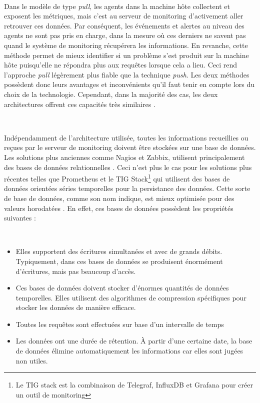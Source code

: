 ~

\noindent
Dans le modèle de type \textit{pull}, les agents dans la machine hôte collectent et exposent les métriques, mais c'est au serveur de monitoring d'activement aller retrouver ces données. Par conséquent, les événements et alertes au niveau des agents ne sont pas pris en charge, dans la mesure où ces derniers ne savent pas quand le système de monitoring récupérera les informations. En revanche, cette méthode permet de mieux identifier si un problème s'est produit sur la machine hôte puisqu'elle ne répondra plus aux requêtes lorsque cela a lieu.\cite{prometheus_doc_pull_push} Ceci rend l'approche \textit{pull} légèrement plus fiable que la technique \textit{push}. Les deux méthodes possèdent donc leurs avantages et inconvénients qu'il faut tenir en compte lors du choix de la technologie. Cependant, dans la majorité des cas, les deux architectures offrent ces capacités très similaires \cite{interview_push_pull}.

~

\noindent
Indépendamment de l'architecture utilisée, toutes les informations recueillies ou reçues par le serveur de monitoring doivent être stockées sur une base de données. Les solutions plus anciennes comme Nagios et Zabbix, utilisent principalement des bases de données relationnelles \cite{nagios_db, zabbix_db}. Ceci n'est plus le cas pour les solutions plus récentes telles que Prometheus et le TIG Stack\footnote{Le TIG stack est la combinaison de Telegraf, InfluxDB et Grafana pour créer un outil de monitoring} qui utilisent des bases de données orientées séries temporelles pour la persistance des données. Cette sorte de base de données, comme son nom indique, est mieux optimisée pour des valeurs horodatées \cite{time_series_fr}. En effet, ces bases de données possèdent les propriétés suivantes \cite{alibaba_timeseries}:

~

\begin{itemize}
  \item Elles supportent des écritures simultanées et avec de grands débits. Typiquement, dans ces bases de données se produisent énormément d'écritures, mais pas beaucoup d'accès.
  \item Ces bases de données doivent stocker d'énormes quantités de données temporelles. Elles utilisent des algorithmes de compression spécifiques pour stocker les données de manière efficace. \cite{di2007efficient}
  \item Toutes les requêtes sont effectuées sur base d'un intervalle de temps
  \item Les données ont une durée de rétention. À partir d'une certaine date, la base de données élimine automatiquement les informations car elles sont jugées non utiles.
\end{itemize}

